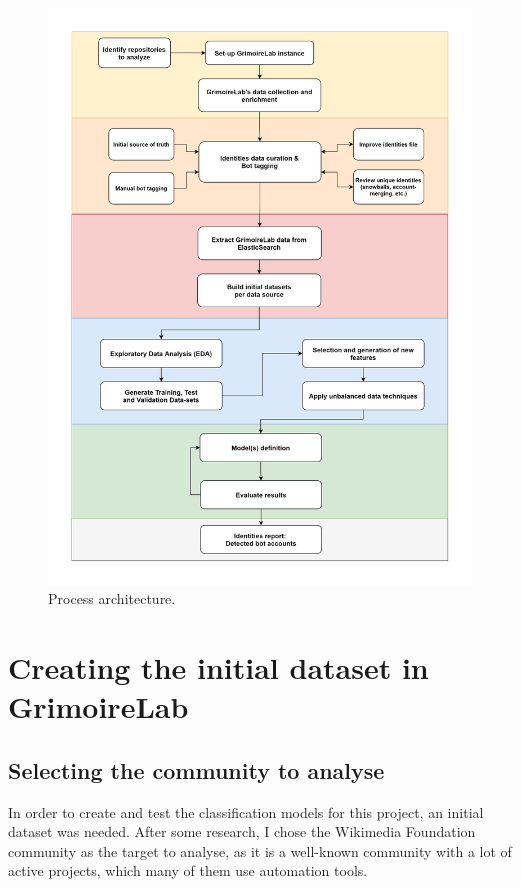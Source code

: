 \documentclass[a4paper, 12pt]{book}
\begin{document}
\begin{figure}
  \centering
  \includegraphics[width=16.5cm, keepaspectratio]{img/sections-architechture-revelio.png}
  \caption{Process architecture.}
  \label{fig:process-arch}
\end{figure}

\section{Creating the initial dataset in GrimoireLab} 
\label{sec:creating-dataset}

\subsection{Selecting the community to analyse}
\label{ssec:selecting-community}
In order to create and test the classification models for this project, an initial dataset was needed. After some research, I chose the Wikimedia Foundation community as the target to analyse, as it is a well-known community with a lot of active projects, which many of them use automation tools. 
\end{document}
